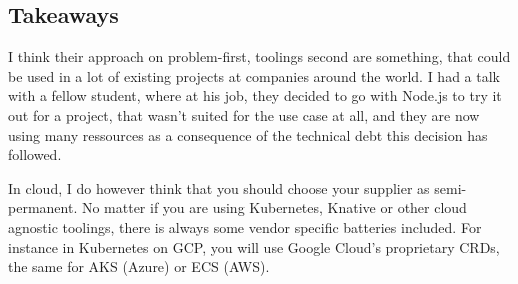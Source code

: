 \documentclass[11pt]{article}
\begin{document}
\subsection*{Takeaways}
I think their approach on problem-first, toolings second are something, that could be used in a lot of existing projects at companies around the world. I had a talk with a fellow student, where at his job, they decided to go with Node.js to try it out for a project, that wasn't suited for the use case at all, and they are now using many ressources as a consequence of the technical debt this decision has followed.

In cloud, I do however think that you should choose your supplier as semi-permanent. No matter if you are using Kubernetes, Knative or other cloud agnostic toolings, there is always some vendor specific batteries included. For instance in Kubernetes on GCP, you will use Google Cloud's proprietary CRDs, the same for AKS (Azure) or ECS (AWS).
\end{document}
